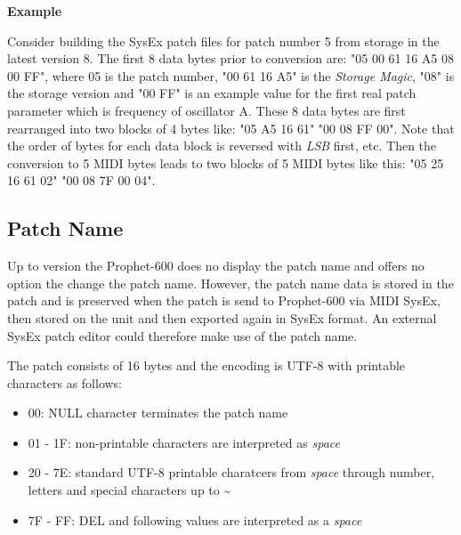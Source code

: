 \textbf{Example}

Consider building the SysEx patch files for patch number 5 from storage in the latest version 8. The first 8 data bytes prior to conversion are: "05 00 61 16 A5 08 00 FF", where 05 is the patch number, "00 61 16 A5" is the \textit{Storage Magic}, "08" is the storage version and "00 FF" is an example value for the first real patch parameter which is frequency of oscillator A. These 8 data bytes are first rearranged into two blocks of 4 bytes like: "05 A5 16 61" "00 08 FF 00". Note that the order of bytes for each data block is reversed with \textit{LSB} first, etc. Then the conversion to 5 MIDI bytes leads to two blocks of 5 MIDI bytes like this: "05 25 16 61 02" "00 08 7F 00 04".


\subsection{Patch Name}

Up to version \version the Prophet-600 does no display the patch name and offers no option the change the patch name. However, the patch name data is stored in the patch and is preserved when the patch is send to Prophet-600 via MIDI SysEx, then stored on the unit and then exported again in SysEx format. An external SysEx patch editor could therefore make use of the patch name.

The patch consists of 16 bytes and the encoding is UTF-8 with printable characters as follows:

\begin{itemize}
  \item 00: NULL character terminates the patch name
  \item 01 - 1F: non-printable characters are interpreted as \textit{space}
  \item 20 - 7E: standard UTF-8 printable charatcers from \textit{space} through number, letters and special characters up to \textasciitilde
  \item 7F - FF: DEL and following values are interpreted as a \textit{space}
\end{itemize}
 
